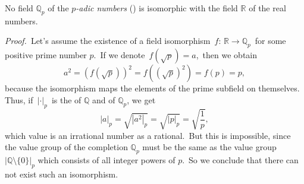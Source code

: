 \documentclass[12pt]{article}
\begin{document}
No field $\mathbb{Q}_p$ of the {\em $p$-adic numbers} () is isomorphic with the field $\mathbb{R}$ of the real numbers.

{\em Proof.} \,Let's assume the existence of a field isomorphism \,$f:\,\mathbb{R}\to \mathbb{Q}_p$\, for some positive prime number $p$. \,If we denote \,$f(\sqrt{p}) = a$, \,then we obtain 
         $$a^2 = (f(\sqrt{p}))^2 = f((\sqrt{p})^2) = f(p) = p,$$
because the isomorphism maps the elements of the prime subfield on themselves. \,Thus, if \,$|\cdot|_p$\, is the  of $\mathbb{Q}$ and of $\mathbb{Q}_p$, we get 
 $$|a|_p = \sqrt{|a^2|_p} = \sqrt{|p|_p} = \sqrt{\frac{1}{p}},$$
which value is an irrational number as a  rational. \,But this is impossible, since the value group of the completion $\mathbb{Q}_p$ must be the same as the value group $|\mathbb{Q}\setminus\{0\}|_p$ which consists of all integer powers of $p$. \,So we conclude that there can not exist such an isomorphism.
\end{document}
